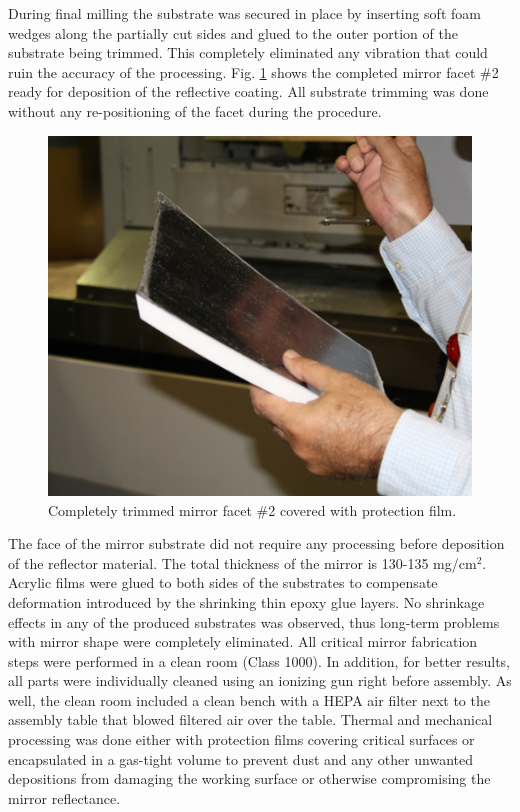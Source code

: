 During final milling the substrate was secured in place by inserting soft foam wedges along the partially cut sides and glued to the outer portion of the substrate being trimmed. This completely eliminated any vibration that could ruin the accuracy of the processing. Fig. \ref{fig:Trimmed} shows the completed mirror facet \#2 ready for deposition of the reflective coating. All substrate trimming was done without any re-positioning of the facet during the procedure. 

\begin{figure}[ht]
    \centering
    \includegraphics[width=1.0\linewidth]{images/Trimmed}
    \caption{Completely trimmed mirror facet \#2 covered with protection film. }
    \label{fig:Trimmed}
\end{figure}

The face of the mirror substrate did not require any processing before deposition of the reflector material. The total thickness of the mirror is 130-135 mg/cm$^{2}$. Acrylic films were glued to both sides of the substrates to compensate deformation introduced by the shrinking thin epoxy glue layers. No shrinkage effects in any of the produced substrates was observed, thus long-term problems with mirror shape were completely eliminated. All critical mirror fabrication steps were performed in a clean room (Class 1000). In addition, for better results, all parts were individually cleaned using an ionizing gun right before assembly. As well, the clean room included a clean bench with a HEPA air filter next to the assembly table that blowed filtered air over the table. Thermal and mechanical processing was done either with protection films covering critical surfaces or encapsulated in a gas-tight volume to prevent dust and any other unwanted depositions from damaging the working surface or otherwise compromising the mirror reflectance.

